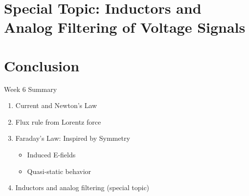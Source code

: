 \documentclass{beamer}
\begin{document}
\section{Special Topic: Inductors and Analog Filtering of Voltage Signals}

\section{Conclusion}

\begin{frame}{Week 6 Summary}
\begin{enumerate}
\item Current and Newton's Law
\item Flux rule from Lorentz force
\item Faraday's Law: Inspired by Symmetry
\begin{itemize}
\item Induced E-fields
\item Quasi-static behavior
\end{itemize}
\item Inductors and analog filtering (special topic)
\end{enumerate}
\end{frame}
\end{document}
